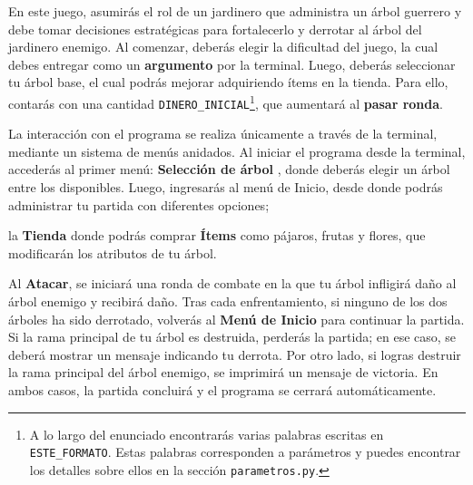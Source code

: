 \label{sec:flujo}

En este juego, asumirás el rol de un jardinero que administra un árbol guerrero y debe tomar decisiones estratégicas para fortalecerlo y derrotar al árbol del jardinero enemigo. Al comenzar, deberás elegir la dificultad del juego, la cual debes entregar como un \textbf{argumento} por la terminal. Luego, deberás seleccionar tu árbol base, el cual podrás mejorar adquiriendo ítems en la tienda. Para ello, contarás con una cantidad \texttt{DINERO\_INICIAL}\footnote{A lo largo del enunciado encontrarás varias palabras escritas en \texttt{ESTE\_FORMATO}. Estas palabras corresponden a parámetros y puedes encontrar los detalles sobre ellos en la sección \texttt{parametros.py}.}, que aumentará al \textbf{pasar ronda}. 


La interacción con el programa se realiza únicamente a través de la terminal, mediante un sistema de menús anidados.  Al iniciar el programa desde la terminal, accederás al primer menú: \textbf{Selección de árbol} , donde deberás elegir un árbol entre los disponibles. Luego, ingresarás al menú de Inicio, desde donde podrás administrar tu partida con diferentes opciones; 

la \textbf{Tienda}  donde podrás comprar \textbf{Ítems} como  pájaros, frutas y flores, que modificarán los atributos de tu árbol.


Al \textbf{Atacar}, se iniciará una ronda de combate en la que tu árbol infligirá daño al árbol enemigo y recibirá daño. Tras cada enfrentamiento, 
si ninguno de los dos árboles ha sido derrotado, volverás al \textbf{Menú de Inicio} para continuar la partida. Si la rama principal de tu árbol es destruida, perderás la partida; en ese caso, se deberá mostrar un mensaje indicando tu derrota. Por otro lado, si logras destruir la rama principal  del árbol enemigo, se imprimirá un mensaje de victoria. En ambos casos, la partida concluirá y el programa se cerrará automáticamente.

